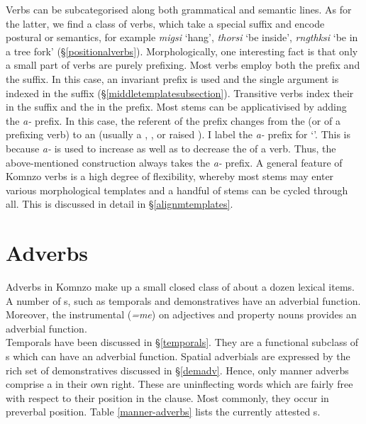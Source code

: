 Verbs can be subcategorised along both grammatical and semantic lines. As for the latter, we find a class of  verbs, which take a special  suffix and encode postural or  semantics, for example \emph{migsi} `hang', \emph{thorsi} `be inside', \emph{rngthksi} `be in a tree fork' (\S{}\ref{positionalverbs}). Morphologically, one interesting fact is that only a small part of  verbs are purely prefixing. Most  verbs employ both the prefix and the suffix. In this case, an invariant  prefix is used and the single argument is indexed in the suffix (\S{}\ref{middletemplatesubsection}). Transitive verbs index their  in the suffix and the  in the prefix. Most stems can be applicativised by adding the \emph{a-} prefix. In this case, the referent of the  prefix changes from the  (or  of a prefixing verb) to an  (usually a , , or raised ). I label the \emph{a-} prefix \Vc{} for `'. This is because \emph{a-} is used to increase as well as to decrease the  of a verb. Thus, the above-mentioned  construction always takes the \emph{a-} prefix. A general feature of Komnzo verbs is a high degree of flexibility, whereby most stems may enter various morphological templates and a handful of stems can be cycled through all. This is discussed in detail in \S{}\ref{alignmtemplates}.

\section{Adverbs} \label{adverbs}

Adverbs in Komnzo make up a small closed class of about a dozen lexical items. A number of s, such as temporals and demonstratives have an adverbial function. Moreover, the instrumental  (\emph{=me}) on adjectives and property nouns provides an adverbial function.\\

Temporals have been discussed in \S{}\ref{temporals}. They are a functional subclass of s which can have an adverbial function. Spatial adverbials are expressed by the rich set of demonstratives discussed in \S{}\ref{demadv}. Hence, only manner adverbs comprise a  in their own right. These are uninflecting words which are fairly free with respect to their position in the clause. Most commonly, they occur in preverbal position. Table \ref{manner-adverbs} lists the currently attested s.

